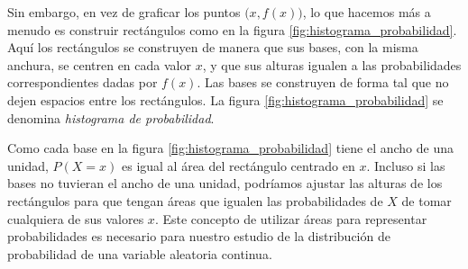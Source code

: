 Sin embargo, en vez de graficar los puntos $\big(x, f (x)\big)$, lo que hacemos más a menudo es construir rectángulos como en la figura \ref{fig:histograma_probabilidad}. Aquí los rectángulos se construyen de manera que sus bases, con la misma anchura, se centren en cada valor $x$, y que sus alturas igualen a las probabilidades correspondientes dadas por $f(x)$. Las bases se construyen de forma tal que no dejen espacios entre los rectángulos. La figura \ref{fig:histograma_probabilidad} se denomina \emph{histograma de probabilidad}.

Como cada base en la figura \ref{fig:histograma_probabilidad} tiene el ancho de una unidad, $P(X = x)$ es igual al área del rectángulo centrado en $x$. Incluso si las bases no tuvieran el ancho de una unidad, podríamos ajustar las alturas de los rectángulos para que tengan áreas que igualen las probabilidades de $X$ de tomar cualquiera de sus valores $x$. Este concepto de utilizar áreas para representar probabilidades es necesario para nuestro estudio de la distribución de probabilidad de una variable aleatoria continua.
